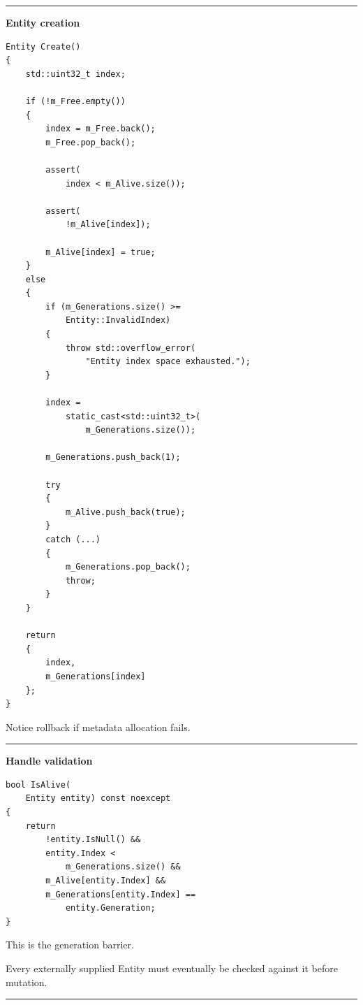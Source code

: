 \begin{center}\rule{0.5\linewidth}{0.5pt}\end{center}

\textbf{Entity creation}

\begin{verbatim}
Entity Create()
{
    std::uint32_t index;

    if (!m_Free.empty())
    {
        index = m_Free.back();
        m_Free.pop_back();

        assert(
            index < m_Alive.size());

        assert(
            !m_Alive[index]);

        m_Alive[index] = true;
    }
    else
    {
        if (m_Generations.size() >=
            Entity::InvalidIndex)
        {
            throw std::overflow_error(
                "Entity index space exhausted.");
        }

        index =
            static_cast<std::uint32_t>(
                m_Generations.size());

        m_Generations.push_back(1);

        try
        {
            m_Alive.push_back(true);
        }
        catch (...)
        {
            m_Generations.pop_back();
            throw;
        }
    }

    return
    {
        index,
        m_Generations[index]
    };
}
\end{verbatim}

Notice rollback if metadata allocation fails.

\begin{center}\rule{0.5\linewidth}{0.5pt}\end{center}

\textbf{Handle validation}

\begin{verbatim}
bool IsAlive(
    Entity entity) const noexcept
{
    return
        !entity.IsNull() &&
        entity.Index <
            m_Generations.size() &&
        m_Alive[entity.Index] &&
        m_Generations[entity.Index] ==
            entity.Generation;
}
\end{verbatim}

This is the generation barrier.

Every externally supplied Entity must eventually be checked against it before mutation.

\begin{center}\rule{0.5\linewidth}{0.5pt}\end{center}

